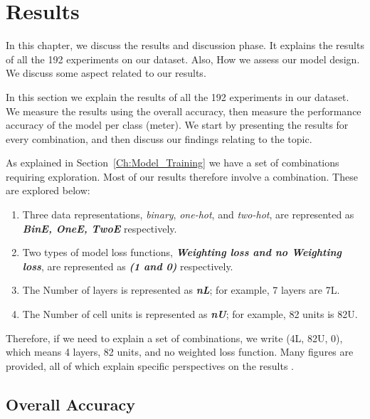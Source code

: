 \chapter{Results}\label{Sec:Results}

{\color{red} In this chapter, we discuss the results and discussion phase. It explains the results of all the 192 experiments on our dataset. Also, How we assess our model design. We discuss some aspect related to our results.}

In this section we explain the results of all the 192 experiments in our dataset. We measure the results using the overall accuracy, then measure the performance accuracy of the model per class (meter). We start by presenting the results for every combination, and then discuss our findings relating to the topic.

As explained in Section~\ref{Ch:Model_Training} we have a set of combinations requiring exploration. Most of our results therefore involve a combination. These are explored below:

\begin{enumerate}

 \item Three data representations, \textit{binary}, \textit{one-hot}, and \textit{two-hot}, are represented as \textbf{\textit{BinE, OneE, TwoE}} respectively.
 \item Two types of model loss functions, \textbf{\textit{Weighting loss and no Weighting loss}}, are represented as \textbf{\textit{(1 and 0)}} respectively.
 \item The Number of layers is represented as \textbf{\textit{nL}}; for example, 7 layers are 7L.
 \item The Number of cell units is represented as \textbf{\textit{nU}}; for example, 82 units is 82U.

\end{enumerate}

Therefore, if we need to explain a set of combinations, we write (4L, 82U, 0), which means 4 layers, 82 units, and no weighted loss function. Many figures are provided, all of which explain specific perspectives on the results .

\section{Overall Accuracy}

